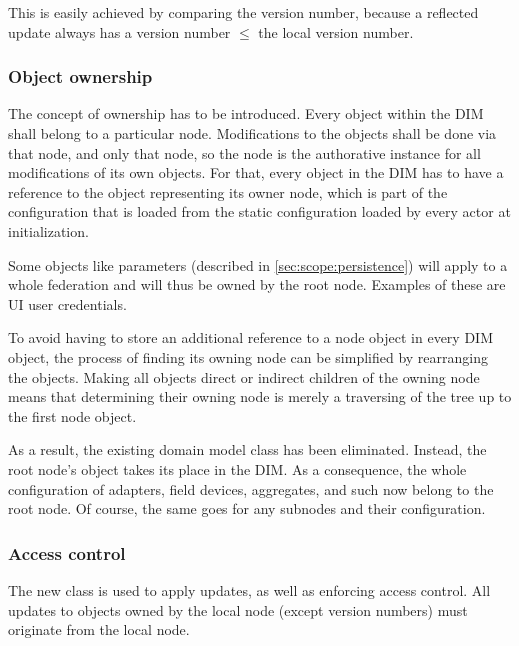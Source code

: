 This is easily achieved by comparing the version number, because a reflected
update always has a version number $\leqslant$ the local version number.


\subsubsection{Object ownership}\label{sec:approach:dim:ownership}
The concept of ownership has to be introduced. Every object within the DIM
shall belong to a particular node. Modifications to the objects shall be done via
that node, and only that node, so the node is the authorative instance for all modifications of its own objects.
For that, every object in the DIM has to have a reference
to the object representing its owner node, which is part of
the configuration that is loaded from the static configuration loaded by every
actor at initialization.

Some objects like parameters (described in \autoref{sec:scope:persistence})
will apply to a whole federation and will thus be owned by the root node.
Examples of these are UI user credentials.

To avoid having to store an additional reference to a node object in every DIM
object, the process of finding its owning node can be simplified by rearranging
the objects. Making all objects direct or indirect children of the owning node
means that determining their owning node is merely a traversing of the tree up
to the first node object.

As a result, the existing domain model class 
has been eliminated. Instead, the root node's
 object takes its place in the DIM. As a
consequence, the whole configuration of adapters, field devices, aggregates,
and such now belong to the root node. Of course, the same goes for any subnodes
and their configuration.

\subsubsection{Access control}
The new class  is used to apply
updates, as well as enforcing access control. All updates to objects owned by
the local node (except version numbers) must originate from the local node.



